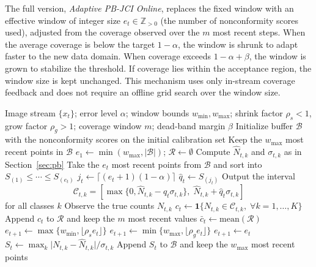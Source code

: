 \documentclass[smallextended,natbib]{svjour3}
\begin{document}
The full version, \emph{Adaptive PB-JCI Online}, replaces the fixed window with an
effective window of integer size \(e_t\in\mathbb{Z}_{>0}\) (the number of
nonconformity scores used), adjusted from the coverage observed over the \(m\) most
recent steps. When the average coverage is below the target \(1-\alpha\), the
window is shrunk to adapt faster to the new data domain. When coverage exceeds
\(1-\alpha+\beta\), the window is grown to stabilize the threshold. If coverage
lies within the acceptance region, the window size is kept unchanged. This
mechanism uses only in-stream coverage feedback and does not require an offline
grid search over the window size.
\begin{algorithm}[t]
\caption{Adaptive PB-JCI Online}\label{alg:adaptive}
\begin{algorithmic}[1]
\Require Image stream \(\{x_t\}\); error level \(\alpha\); window bounds \(w_{\min},w_{\max}\);
shrink factor \(\rho_s<1\), grow factor \(\rho_g>1\); coverage window \(m\); dead-band margin \(\beta\)
\State Initialize buffer \(\mathcal{B}\) with the nonconformity scores on the initial calibration set
\State Keep the \(w_{\max}\) most recent points in \(\mathcal{B}\)
\State \(e_1 \gets \min(w_{\max},\lvert\mathcal{B}\rvert)\); \quad \(\mathcal{R}\gets\emptyset\)
  \State Compute \(\hat{N}_{t,k}\) and \(\sigma_{t,k}\) as in Section~\ref{sec:pb}
  \State Take the \(e_t\) most recent points from \(\mathcal{B}\) and sort into
  \(S_{(1)}\leq \cdots \leq S_{(e_t)}\)
  \State \(j_t \gets \lceil(e_t+1)(1-\alpha)\rceil\)
  \State \(\hat{q}_t \gets S_{(j_t)}\)
  \State Output the interval
  \[
  \mathcal{C}_{t,k}=
  [\max\{0,\hat{N}_{t,k}-\hat{q}_t\sigma_{t,k}\},\;
   \hat{N}_{t,k}+\hat{q}_t\sigma_{t,k}]
  \]
  for all classes \(k\)
  \State Observe the true counts \(N_{t,k}\)
  \State \(c_t \gets \mathbf{1}\{N_{t,k}\in \mathcal{C}_{t,k},\;\forall k=1,\dots,K\}\)
  \State Append \(c_t\) to \(\mathcal{R}\) and keep the \(m\) most recent values
  \State \(\bar{c}_t \gets \mathrm{mean}(\mathcal{R})\)
    \State \(e_{t+1}\gets \max\{w_{\min},\lfloor\rho_s e_t\rfloor\}\)
    \State \(e_{t+1}\gets \min\{w_{\max},\lfloor\rho_g e_t\rfloor\}\)
  \Else
    \State \(e_{t+1}\gets e_t\)
  \EndIf
  \State \(S_t\gets \max_k \lvert N_{t,k}-\hat{N}_{t,k}\rvert/\sigma_{t,k}\)
  \State Append \(S_t\) to \(\mathcal{B}\) and keep the \(w_{\max}\) most recent points
\EndFor
\end{algorithmic}
\end{algorithm}
\end{document}
